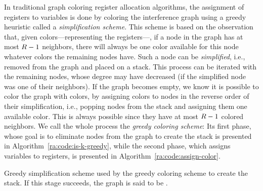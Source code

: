 {In traditional graph coloring register allocation algorithms, the assignment of registers to variables is done by coloring the interference graph using a greedy heuristic called a \emph{simplification scheme}.
This scheme is based on the observation that, given \regs colors---representing the registers---, if a node in the graph has at most $R-1$ neighbors, there will always be one color available for this node whatever colors the remaining nodes have.
Such a node can be \emph{simplified}, i.e., removed from the graph and placed on a stack.
This process can be iterated with the remaining nodes, whose degree may have decreased (if the simplified node was one of their neighbors).
If the graph becomes empty, we know it is possible to color the graph with \regs colors, by assigning colors to nodes in the reverse order of their simplification, i.e., popping nodes from the stack and assigning them one available color.
This is always possible since they have at most $R-1$ colored neighbors.
We call the whole process the \emph{greedy coloring scheme}:
Its first phase, whose goal is to eliminate nodes from the graph to create the stack is presented in Algorithm~\ref{ra:code:is-k-greedy}, while the second phase, which assigns variables to registers, is presented in Algorithm~\ref{ra:code:assign-color}.


\begin{algorithm}[h]
  \caption{Greedy simplification scheme used by the greedy coloring scheme to create the stack. If this stage succeeds, the graph is said to be \gr{\regs}.}
\label{ra:code:is-k-greedy}

\end{algorithm}


}

